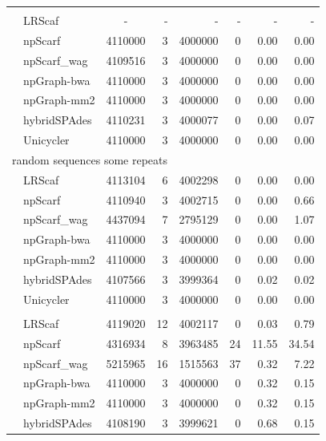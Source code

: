 \documentclass[10pt,letterpaper]{article}
\begin{document}
\begin{longtable}[!hpt]{llcrrrrr}
\rowcolor{Gray}
\multicolumn{8}{l}{random sequences no repeats} \\* %
\nobreakmidrule
\rowcolor{Gray}
& LRScaf & - & - & - & - & - & - \\*
\rowcolor{Gray}
& npScarf &  4110000 &  3  &  4000000  &  0  & 0.00  & 0.00\\*
\rowcolor{Gray}
& npScarf\_wag & 4109516  &  3  &  4000000  &  0  & 0.00  & 0.00\\*
\rowcolor{Gray}
& npGraph-bwa & 4110000  &  3  &  4000000  &  0  & 0.00  & 0.00\\*
\rowcolor{Gray}
& npGraph-mm2 & 4110000  &  3  &  4000000  &  0  & 0.00  & 0.00\\*
\rowcolor{Gray}
& hybridSPAdes & 4110231  &  3  & 4000077   &  0  & 0.00  &  0.07\\*
\rowcolor{Gray}
& Unicycler & 4110000  &  3  &  4000000  &  0  & 0.00  &  0.00\\
\hline
\multicolumn{8}{l}{random sequences some repeats} \\* %
\nobreakmidrule
& LRScaf & 4113104 & 6 & 4002298 & 0 & 0.00 & 0.00\\*
& npScarf & 4110940  &  3  &  4002715  &  0  &  0.00 &  0.66\\*
& npScarf\_wag & 4437094  &  7 &  2795129  &  0  &  0.00 &  1.07\\*
& npGraph-bwa & 4110000  &  3  &  4000000  &  0 &  0.00 &  0.00\\*
& npGraph-mm2 &  4110000 &  3  &   4000000 & 0  & 0.00  &  0.00\\*
& hybridSPAdes & 4107566  &  3  &  3999364  &  0  & 0.02  & 0.02\\*
& Unicycler &  4110000 &  3 & 4000000  &  0 & 0.00  &  0.00\\
\hline
\rowcolor{Gray}
\multicolumn{8}{l}{random sequences many repeats} \\* %
\nobreakmidrule
\rowcolor{Gray}
& LRScaf & 4119020 & 12 & 4002117 & 0 & 0.03 & 0.79\\* 
\rowcolor{Gray}
& npScarf &  4316934 &  8  &  3963485  &  24  & 11.55  & 34.54\\*
\rowcolor{Gray}
& npScarf\_wag &  5215965 &  16  &  1515563  &  37  & 0.32  & 7.22\\*
\rowcolor{Gray}
& npGraph-bwa & 4110000  &  3  &  4000000  &  0  &  0.32 & 0.15\\*
\rowcolor{Gray}
& npGraph-mm2 &  4110000 &  3  &  4000000  &  0  & 0.32  & 0.15\\*
\rowcolor{Gray}
& hybridSPAdes & 4108190  &  3  &  3999621  &  0  &  0.68 &  0.15\\*

\end{longtable}
\end{document}
